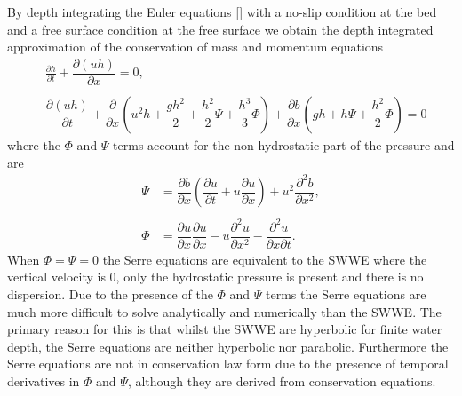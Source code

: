 By depth integrating the Euler equations [] with a no-slip condition at the bed and a free surface condition at the free surface we obtain the depth integrated approximation of the conservation of mass and momentum equations
\begin{subequations}
	\begin{align}
	&\frac{\partial h}{\partial t} + \dfrac{\partial (uh)}{\partial x} = 0,  \label{eqn:FullSerreNonConMass} \\ \nonumber \\
	&\dfrac{\partial (uh)}{\partial t} + \dfrac{\partial}{\partial x} \left ( u^2h + \dfrac{gh^2}{2} + \dfrac{h^2}{2}{\Psi} + \dfrac{h^3}{3}{ \Phi }  \right )  +  \dfrac{\partial b}{\partial x} \left (gh +   h \Psi + \dfrac{h^2}{2}{ \Phi }  \right ) = 0	\label{eqn:FullSerreNonConMome}
	\end{align}
	\label{eqn:FullSerreNonCon}
\end{subequations}
where the $\Phi$ and $\Psi$ terms account for the non-hydrostatic part of the pressure and are
	\begin{subequations}
	\begin{align}
	{ \Psi }  &= \dfrac{\partial b}{\partial x}\left(\dfrac{\partial u}{\partial t} + u\dfrac{\partial u}{\partial x} \right)  + u^2\dfrac{\partial^2 b}{\partial x^2}, \label{eqn:SerreeqnPsi} \\ \nonumber \\
 { \Phi }  &= \dfrac{\partial u }{\partial x} \dfrac{\partial u}{\partial x} -u \dfrac{\partial^2 u}{\partial x^2}  - \dfrac{\partial^2 u}{\partial x \partial t} . \label{eqn:SerreeqnPhi} 
	\end{align}
	\label{eqn:FullSerreNonConVarDef}
	\end{subequations}
When $\Phi = \Psi = 0$ the Serre equations are equivalent to the SWWE where the vertical velocity is $0$, only the hydrostatic pressure is present and there is no dispersion. Due to the presence of the $\Phi$ and $\Psi$ terms the Serre equations are much more difficult to solve analytically and numerically than the SWWE. The primary reason for this is that whilst the SWWE are hyperbolic for finite water depth, the Serre equations are neither hyperbolic nor parabolic. Furthermore the Serre equations are not in conservation law form due to the presence of temporal derivatives in $\Phi$ and $\Psi$, although they are derived from conservation equations. 

